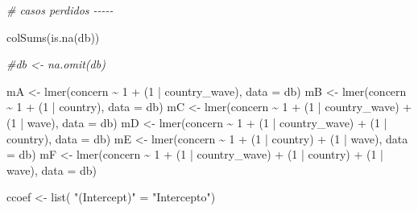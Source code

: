 \documentclass[
  12pt,
  a4paper,
]{article}
\newenvironment{Shaded}{\begin{snugshade}}{\end{snugshade}}
\newcommand{\AttributeTok}[1]{\textcolor[rgb]{0.77,0.63,0.00}{#1}}
\newcommand{\CommentTok}[1]{\textcolor[rgb]{0.56,0.35,0.01}{\textit{#1}}}
\newcommand{\DecValTok}[1]{\textcolor[rgb]{0.00,0.00,0.81}{#1}}
\newcommand{\FunctionTok}[1]{\textcolor[rgb]{0.00,0.00,0.00}{#1}}
\newcommand{\NormalTok}[1]{#1}
\newcommand{\OtherTok}[1]{\textcolor[rgb]{0.56,0.35,0.01}{#1}}
\newcommand{\SpecialCharTok}[1]{\textcolor[rgb]{0.00,0.00,0.00}{#1}}
\newcommand{\StringTok}[1]{\textcolor[rgb]{0.31,0.60,0.02}{#1}}
\begin{document}
\begin{Shaded}
\begin{Highlighting}[]
\CommentTok{\# casos perdidos {-}{-}{-}{-}{-}}

\FunctionTok{colSums}\NormalTok{(}\FunctionTok{is.na}\NormalTok{(db))}

\CommentTok{\#db \textless{}{-} na.omit(db)}


\NormalTok{mA }\OtherTok{\textless{}{-}} \FunctionTok{lmer}\NormalTok{(concern }\SpecialCharTok{\textasciitilde{}} \DecValTok{1} \SpecialCharTok{+}\NormalTok{ (}\DecValTok{1} \SpecialCharTok{|}\NormalTok{ country\_wave), }\AttributeTok{data =}\NormalTok{ db)}
\NormalTok{mB }\OtherTok{\textless{}{-}} \FunctionTok{lmer}\NormalTok{(concern }\SpecialCharTok{\textasciitilde{}} \DecValTok{1} \SpecialCharTok{+}\NormalTok{ (}\DecValTok{1} \SpecialCharTok{|}\NormalTok{ country), }\AttributeTok{data =}\NormalTok{ db)}
\NormalTok{mC }\OtherTok{\textless{}{-}} \FunctionTok{lmer}\NormalTok{(concern }\SpecialCharTok{\textasciitilde{}} \DecValTok{1} \SpecialCharTok{+}\NormalTok{ (}\DecValTok{1} \SpecialCharTok{|}\NormalTok{ country\_wave) }\SpecialCharTok{+}\NormalTok{ (}\DecValTok{1} \SpecialCharTok{|}\NormalTok{ wave), }\AttributeTok{data =}\NormalTok{ db)}
\NormalTok{mD }\OtherTok{\textless{}{-}} \FunctionTok{lmer}\NormalTok{(concern }\SpecialCharTok{\textasciitilde{}} \DecValTok{1} \SpecialCharTok{+}\NormalTok{ (}\DecValTok{1} \SpecialCharTok{|}\NormalTok{ country\_wave) }\SpecialCharTok{+}\NormalTok{ (}\DecValTok{1} \SpecialCharTok{|}\NormalTok{ country), }\AttributeTok{data =}\NormalTok{ db)}
\NormalTok{mE }\OtherTok{\textless{}{-}} \FunctionTok{lmer}\NormalTok{(concern }\SpecialCharTok{\textasciitilde{}} \DecValTok{1} \SpecialCharTok{+}\NormalTok{ (}\DecValTok{1} \SpecialCharTok{|}\NormalTok{ country) }\SpecialCharTok{+}\NormalTok{ (}\DecValTok{1} \SpecialCharTok{|}\NormalTok{ wave), }\AttributeTok{data =}\NormalTok{ db)}
\NormalTok{mF }\OtherTok{\textless{}{-}} \FunctionTok{lmer}\NormalTok{(concern }\SpecialCharTok{\textasciitilde{}} \DecValTok{1} \SpecialCharTok{+}\NormalTok{ (}\DecValTok{1} \SpecialCharTok{|}\NormalTok{ country\_wave) }\SpecialCharTok{+}\NormalTok{ (}\DecValTok{1} \SpecialCharTok{|}\NormalTok{ country) }\SpecialCharTok{+}
\NormalTok{             (}\DecValTok{1} \SpecialCharTok{|}\NormalTok{ wave), }\AttributeTok{data =}\NormalTok{ db) }


\NormalTok{ccoef }\OtherTok{\textless{}{-}} \FunctionTok{list}\NormalTok{(}
  \StringTok{"(Intercept)"} \OtherTok{=} \StringTok{"Intercepto"}\NormalTok{)}


\end{Highlighting}
\end{Shaded}
\end{document}
